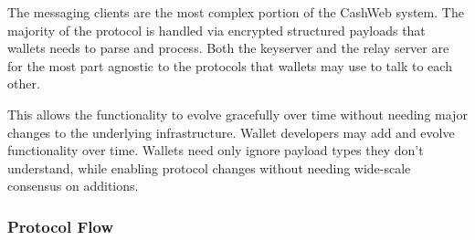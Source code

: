 \documentclass{article}
\begin{document}
The messaging clients are the most complex portion of the CashWeb system. The majority of the protocol is handled via encrypted structured payloads that wallets needs to parse and process. Both the keyserver and the relay server are for the most part agnostic to the protocols that wallets may use to talk to each other.

This allows the functionality to evolve gracefully over time without needing major changes to the underlying infrastructure. Wallet developers may add and evolve functionality over time. Wallets need only ignore payload types they don't understand, while enabling protocol changes without needing wide-scale consensus on additions.

\subsubsection{Protocol Flow}

\begin{figure}[H]
  \begin{center}
  \end{center}
\end{figure}

\begin{figure}[H]
  \begin{center}
  \end{center}
\end{figure}
\end{document}
